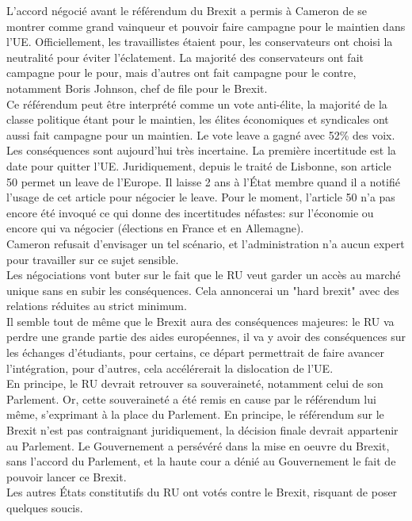 \documentclass[10pt, a4paper, openany]{book}
\begin{document}
L'accord négocié avant le référendum du Brexit a permis à Cameron de se montrer comme grand vainqueur et pouvoir faire campagne pour le maintien dans l'UE. Officiellement, les travaillistes étaient pour, les conservateurs ont choisi la neutralité pour éviter l'éclatement. La majorité des conservateurs ont fait campagne pour le pour, mais d'autres ont fait campagne pour le contre, notamment Boris Johnson, chef de file pour le Brexit. \\
Ce référendum peut être interprété comme un vote anti-élite, la majorité de la classe politique étant pour le maintien, les élites économiques et syndicales ont aussi fait campagne pour un maintien. Le vote leave a gagné avec 52\% des voix. \\
Les conséquences sont aujourd'hui très incertaine. La première incertitude est la date pour quitter l'UE. Juridiquement, depuis le traité de Lisbonne, son article 50 permet un leave de l'Europe. Il laisse 2 ans à l'État membre quand il a notifié l'usage de cet article pour négocier le leave. Pour le moment, l'article 50 n'a pas encore été invoqué ce qui donne des incertitudes néfastes: sur l'économie ou encore qui va négocier (élections en France et en Allemagne). \\
Cameron refusait d'envisager un tel scénario, et l'administration n'a aucun expert pour travailler sur ce sujet sensible. \\
Les négociations vont buter sur le fait que le RU veut garder un accès au marché unique sans en subir les conséquences. Cela annoncerai un "hard brexit" avec des relations réduites au strict minimum. \\
Il semble tout de même que le Brexit aura des conséquences majeures: le RU va perdre une grande partie des aides européennes, il va y avoir des conséquences sur les échanges d'étudiants, pour certains, ce départ permettrait de faire avancer l'intégration, pour d'autres, cela accélérerait la dislocation de l'UE. \\
En principe, le RU devrait retrouver sa souveraineté, notamment celui de son Parlement. Or, cette souveraineté a été remis en cause par le référendum lui même, s'exprimant à la place du Parlement. En principe, le référendum sur le Brexit n'est pas contraignant juridiquement, la décision finale devrait appartenir au Parlement. Le Gouvernement a persévéré dans la mise en oeuvre du Brexit, sans l'accord du Parlement, et la haute cour a dénié au Gouvernement le fait de pouvoir lancer ce Brexit. \\
Les autres États constitutifs du RU ont votés contre le Brexit, risquant de poser quelques soucis. 
\end{document}
